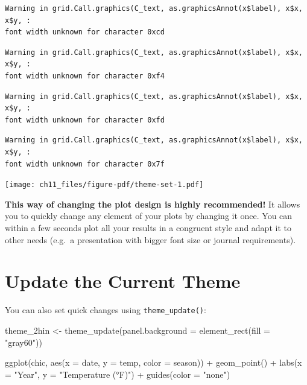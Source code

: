 \documentclass[
  letterpaper,
  DIV=11,
  numbers=noendperiod]{scrreprt}
\newenvironment{Shaded}{\begin{snugshade}}{\end{snugshade}}
\newcommand{\AttributeTok}[1]{\textcolor[rgb]{0.40,0.45,0.13}{#1}}
\newcommand{\FunctionTok}[1]{\textcolor[rgb]{0.28,0.35,0.67}{#1}}
\newcommand{\NormalTok}[1]{\textcolor[rgb]{0.00,0.23,0.31}{#1}}
\newcommand{\OtherTok}[1]{\textcolor[rgb]{0.00,0.23,0.31}{#1}}
\newcommand{\SpecialCharTok}[1]{\textcolor[rgb]{0.37,0.37,0.37}{#1}}
\newcommand{\StringTok}[1]{\textcolor[rgb]{0.13,0.47,0.30}{#1}}
\begin{document}
\begin{verbatim}
Warning in grid.Call.graphics(C_text, as.graphicsAnnot(x$label), x$x, x$y, :
font width unknown for character 0xcd
\end{verbatim}

\begin{verbatim}
Warning in grid.Call.graphics(C_text, as.graphicsAnnot(x$label), x$x, x$y, :
font width unknown for character 0xf4
\end{verbatim}

\begin{verbatim}
Warning in grid.Call.graphics(C_text, as.graphicsAnnot(x$label), x$x, x$y, :
font width unknown for character 0xfd
\end{verbatim}

\begin{verbatim}
Warning in grid.Call.graphics(C_text, as.graphicsAnnot(x$label), x$x, x$y, :
font width unknown for character 0x7f
\end{verbatim}

\texttt{[image: ch11\_files/figure-pdf/theme-set-1.pdf]}

\textbf{This way of changing the plot design is highly recommended!} It
allows you to quickly change any element of your plots by changing it
once. You can within a few seconds plot all your results in a congruent
style and adapt it to other needs (e.g.~a presentation with bigger font
size or journal requirements).

\section{Update the Current Theme}\label{update-the-current-theme}

You can also set quick changes using \texttt{theme\_update()}:

\begin{Shaded}
\begin{Highlighting}[]
\NormalTok{theme\_2hin }\OtherTok{\textless{}{-}} \FunctionTok{theme\_update}\NormalTok{(}\AttributeTok{panel.background =} \FunctionTok{element\_rect}\NormalTok{(}\AttributeTok{fill =} \StringTok{"gray60"}\NormalTok{))}

\FunctionTok{ggplot}\NormalTok{(chic, }\FunctionTok{aes}\NormalTok{(}\AttributeTok{x =}\NormalTok{ date, }\AttributeTok{y =}\NormalTok{ temp, }\AttributeTok{color =}\NormalTok{ season)) }\SpecialCharTok{+}
  \FunctionTok{geom\_point}\NormalTok{() }\SpecialCharTok{+} \FunctionTok{labs}\NormalTok{(}\AttributeTok{x =} \StringTok{"Year"}\NormalTok{, }\AttributeTok{y =} \StringTok{"Temperature (°F)"}\NormalTok{) }\SpecialCharTok{+} \FunctionTok{guides}\NormalTok{(}\AttributeTok{color =} \StringTok{"none"}\NormalTok{)}
\end{Highlighting}
\end{Shaded}
\end{document}
